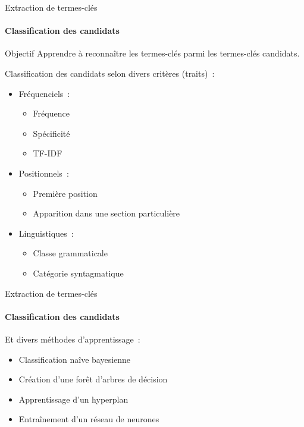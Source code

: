   \begin{frame}{Extraction de termes-clés}\framesubtitle{Classification des candidats}
    \begin{block}{Objectif}
      Apprendre à reconnaître les termes-clés parmi les termes-clés candidats.
    \end{block}

    \vspace{1em}

    Classification des candidats selon divers critères (traits)~:
    \begin{itemize}
      \item{Fréquenciels~:}
      \begin{itemize}
        \item{Fréquence}
        \item{Spécificité}
        \item{TF-IDF~\cite[KEA]{witten1999kea}}
      \end{itemize}
      \item{Positionnels~:}
      \begin{itemize}
        \item{Première position~\cite[KEA]{witten1999kea}}
        \item{Apparition dans une section
              particulière~\cite{nguyen2007keadocumentstructure}}
      \end{itemize}
      \item{Linguistiques~:}
      \begin{itemize}
        \item{Classe grammaticale}
        \item{Catégorie syntagmatique}
      \end{itemize}
    \end{itemize}
  \end{frame}

  \begin{frame}{Extraction de termes-clés}\framesubtitle{Classification des candidats}
    Et divers méthodes d'apprentissage~:
    \begin{itemize}
      \item{Classification naîve bayesienne~\cite[KEA]{witten1999kea}}
      \item{Création d'une forêt d'arbres de
            décision~\cite{turney1999learningalgorithms}}
      \item{Apprentissage d'un hyperplan~\cite{zhang2006svm}}
      \item{Entraînement d'un réseau de
            neurones~\cite{sarkar2010neuralnetwork}}
    \end{itemize}
  \end{frame}

